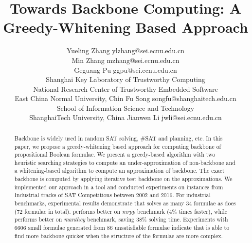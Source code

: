 \documentclass[twoside,11pt]{article}
\begin{document}
%
\title{Towards Backbone Computing: A Greedy-Whitening Based Approach}


\author{\name Yueling Zhang \email ylzhang@sei.ecnu.edu.cn \\
       \name Min Zhang \email mzhang@sei.ecnu.edu.cn \\
       \name Geguang Pu \email ggpu@sei.ecnu.edu.cn \\
       \addr  Shanghai Key Laboratory of Trustworthy Computing
        \\ National Research Center of Trustworthy Embedded Software
        \\ East China Normal University, Chin
       \AND
       \name Fu Song \email songfu@shanghaitech.edu.cn \\
       \addr School of Information Science and Technology
        \\ ShanghaiTech University, China
       \AND
       \name Jianwen Li \email jwli@sei.ecnu.edu.cn \\
       \addr }
\maketitle


\begin{abstract}
Backbone is widely used in random SAT solving, \#SAT and planning, etc.
In this paper, we propose a greedy-whitening based approach for computing backbone of propositional Boolean formulae.
We present a greedy-based algorithm with two heuristic searching strategies to compute an under-approximation of non-backbone and
a whitening-based algorithm to compute an approximation of backbone.
The exact backbone is computed by applying iterative test backbone on the approximations.
We implemented our approach in a tool \tool and conducted experiments on instances from Industrial tracks of SAT Competitions
between 2002 and 2016. For industrial benchmarks, experimental results demonstrate that \tool solves as many 34 formulae as \minibones does (72 formulae in total).
\minibones performs better on \textit{mrpp} benchmark (4\% times faster), while \tool performs better on \textit{manthey} benchmark, saving 38\% solving time.
Experiments with 6606 small formulae generated from 86 unsatisfiable formulae indicate that \tool is able to find more backbone quicker when the structure of the formulae are more complex.
\end{abstract}
\end{document}
